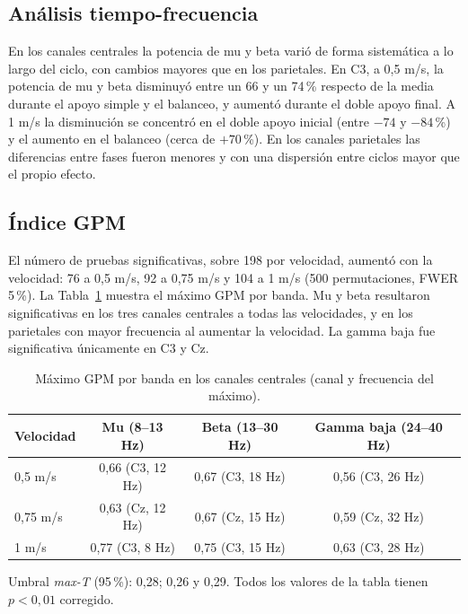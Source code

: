 \documentclass[10pt]{article}
\begin{document}
\subsection{Análisis tiempo-frecuencia}

En los canales centrales la potencia de mu y beta varió de forma sistemática a lo largo del ciclo, con cambios mayores que en los parietales. En C3, a 0,5 m/s, la potencia de mu y beta disminuyó entre un 66 y un 74\,\% respecto de la media durante el apoyo simple y el balanceo, y aumentó durante el doble apoyo final. A 1 m/s la disminución se concentró en el doble apoyo inicial (entre $-74$ y $-84$\,\%) y el aumento en el balanceo (cerca de $+70$\,\%). En los canales parietales las diferencias entre fases fueron menores y con una dispersión entre ciclos mayor que el propio efecto.

\subsection{Índice GPM}

El número de pruebas significativas, sobre 198 por velocidad, aumentó con la velocidad: 76 a 0,5 m/s, 92 a 0,75 m/s y 104 a 1 m/s (500 permutaciones, FWER 5\,\%). La Tabla~\ref{tab:gpm} muestra el máximo GPM por banda. Mu y beta resultaron significativas en los tres canales centrales a todas las velocidades, y en los parietales con mayor frecuencia al aumentar la velocidad. La gamma baja fue significativa únicamente en C3 y Cz.

\begin{table}[H]
\centering
\small
\begin{tabular}{lccc}
\toprule
Velocidad & Mu (8--13 Hz) & Beta (13--30 Hz) & Gamma baja (24--40 Hz) \\
\midrule
0,5 m/s  & 0,66 (C3, 12 Hz) & 0,67 (C3, 18 Hz) & 0,56 (C3, 26 Hz) \\
0,75 m/s & 0,63 (Cz, 12 Hz) & 0,67 (Cz, 15 Hz) & 0,59 (Cz, 32 Hz) \\
1 m/s    & 0,77 (C3, 8 Hz)  & 0,75 (C3, 15 Hz) & 0,63 (C3, 28 Hz) \\
\bottomrule
\end{tabular}

\vspace{1mm}
{\footnotesize Umbral \textit{max-T} (95\,\%): 0,28; 0,26 y 0,29. Todos los valores de la tabla tienen $p<0{,}01$ corregido.}
\caption{Máximo GPM por banda en los canales centrales (canal y frecuencia del máximo).}
\label{tab:gpm}
\end{table}
\end{document}
